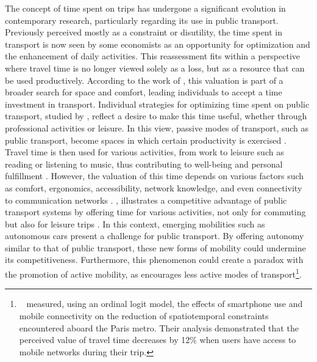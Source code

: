 \begin{refsegment}
The concept of time spent on trips has undergone a significant evolution in contemporary research, particularly regarding its use in public transport. Previously perceived mostly as a constraint or disutility, the time spent in transport is now seen by some economists as an opportunity for optimization and the enhancement of daily activities. This reassessment fits within a perspective where travel time is no longer viewed solely as a loss, but as a resource that can be used productively. According to the work of \textcolor{blue}{\textcite[28]{joly_rapports_2003}}, this valuation is part of a broader search for space and comfort, leading individuals to accept a time investment in transport. Individual strategies for optimizing time spent on public transport, studied by \textcolor{blue}{\textcite[85]{jain_gift_2008}}, reflect a desire to make this time useful, whether through professional activities or leisure. In this view, passive modes of transport, such as public transport, become spaces in which certain productivity is exercised \textcolor{blue}{\autocite[115]{lyons_use_2007}}. Travel time is then used for various activities, from work to leisure such as reading or listening to music, thus contributing to well-being and personal fulfillment \textcolor{blue}{\autocite[17]{moinse_temps_2020}}. However, the valuation of this time depends on various factors such as comfort, ergonomics, accessibility, network knowledge, and even connectivity to communication networks \textcolor{blue}{\autocite[21]{bounie_what_2019}}.  \textcolor{blue}{\autocite[87]{jain_gift_2008}}, illustrates a competitive advantage of public transport systems by offering time for various activities, not only for commuting but also for leisure trips \textcolor{blue}{\autocite[111]{lyons_use_2007}}. In this context, emerging mobilities such as autonomous cars present a challenge for public transport. By offering autonomy similar to that of public transport, these new forms of mobility could undermine its competitiveness. Furthermore, this phenomenon could create a paradox with the promotion of active mobility, as  encourages less active modes of transport\footnote{~
    \textcolor{blue}{\textcite[21]{bounie_what_2019}} measured, using an ordinal logit model, the effects of smartphone use and mobile connectivity on the reduction of spatiotemporal constraints encountered aboard the Paris metro. Their analysis demonstrated that the perceived value of travel time decreases by 12\% when users have access to mobile networks during their trip.
}.%


\end{refsegment}

